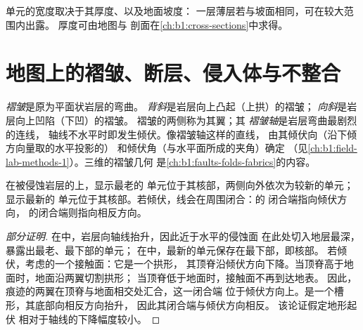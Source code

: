 \begin{remark}[露头宽度]\label{rem:b1:geological-maps:width}
单元的宽度取决于其厚度、以及地面坡度：
一层薄层若与坡面相同，可在较大范围内出露。
厚度可由地图与
剖面在\cref{ch:b1:cross-sections}中求得。
\end{remark}

\section{地图上的褶皱、断层、侵入体与不整合}

\begin{definition}[背斜与向斜]\label{def:b1:geological-maps:fold}
\emph{褶皱}是原为平面状岩层的弯曲。
\emph{背斜}是岩层向上凸起（上拱）的褶皱；
\emph{向斜}是岩层向上凹陷（下凹）的褶皱。
褶皱的两侧称为其翼；其
\emph{褶皱轴}是岩层弯曲最剧烈的连线，
轴线不水平时即发生倾伏。像褶皱轴这样的直线，
由其倾伏向（沿下倾方向量取的水平投影的）
和倾伏角（与水平面所成的夹角）确定
（见\cref{ch:b1:field-lab-methods-1}）。三维的褶皱几何
是\cref{ch:b1:faults-folds-fabrics}的内容。
\end{definition}

\begin{proposition}[褶皱的图形特征]\label{prop:b1:geological-maps:folds}
在被侵蚀岩层的上，显示最老的
单元位于其核部，两侧向外依次为较新的单元；显示最新的
单元位于其核部。若倾伏，线会在周围闭合：的
闭合端指向倾伏方向，
的闭合端则指向相反方向。
\end{proposition}

\begin{proof}[部分证明]
在中，岩层向轴线抬升，因此近于水平的侵蚀面
在此处切入地层最深，暴露出最老、最下部的单元；
在中，最新的单元保存在最下部，即核部。
若倾伏，考虑的一个接触面：它是一个拱形，
其顶脊沿倾伏方向下降。当顶脊高于地面时，地面沿两翼切割拱形；
当顶脊低于地面时，接触面不再到达地表。
因此，痕迹的两翼在顶脊与地面相交处汇合，这一闭合端
位于倾伏方向上。是一个槽形，其底部向相反方向抬升，
因此其闭合端与倾伏方向相反。
该论证假定地形起伏
相对于轴线的下降幅度较小。
\end{proof}

